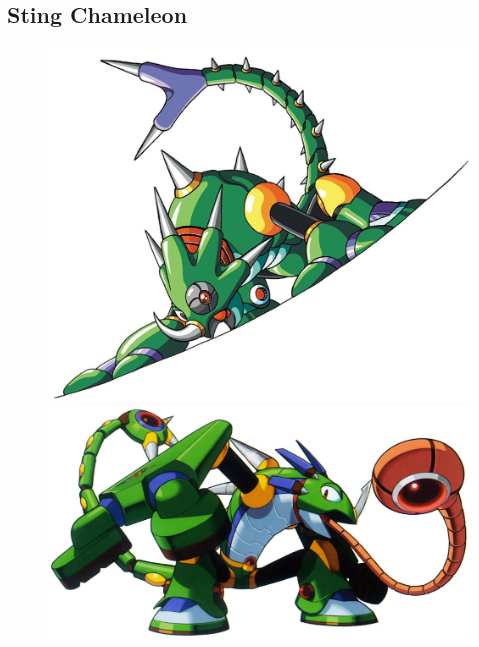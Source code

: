 \subsection{Sting Chameleon}\label{boss:Sting_chameleon}
\begin{figure}[htp]
	\centering
	\includegraphics[height=\portraitsize]{figures/X1/Sting_chameleon/Stingchameleon.jpg}
	\includegraphics[height=\portraitsize]{figures/X1/Sting_chameleon/MHXStingChameleon.jpg}

\end{figure}
